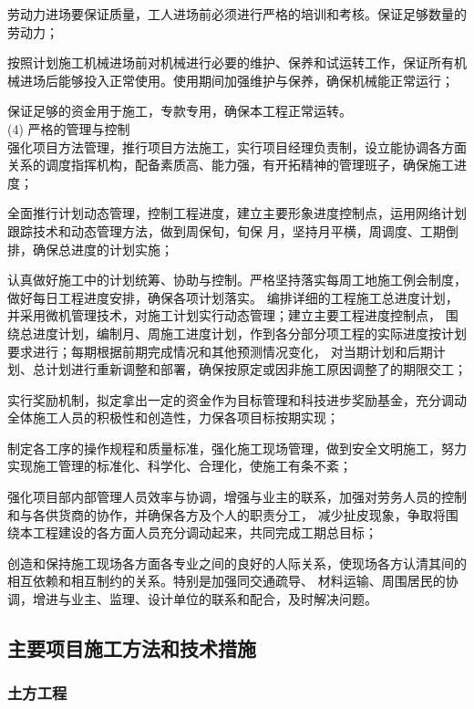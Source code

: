  劳动力进场要保证质量，工人进场前必须进行严格的培训和考核。保证足够数量的劳动力；

 按照计划施工机械进场前对机械进行必要的维护、保养和试运转工作，保证所有机械进场后能够投入正常使用。使用期间加强维护与保养，确保机械能正常运行；

 保证足够的资金用于施工，专款专用，确保本工程正常运转。\\

(4) 严格的管理与控制\\

 强化项目方法管理，推行项目方法施工，实行项目经理负责制，设立能协调各方面关系的调度指挥机构，配备素质高、能力强，有开拓精神的管理班子，确保施工进度；

 全面推行计划动态管理，控制工程进度，建立主要形象进度控制点，运用网络计划跟踪技术和动态管理方法，做到周保旬，旬保
月，坚持月平横，周调度、工期倒排，确保总进度的计划实施；

 认真做好施工中的计划统筹、协助与控制。严格坚持落实每周工地施工例会制度，做好每日工程进度安排，确保各项计划落实。
编排详细的工程施工总进度计划，并采用微机管理技术，对施工计划实行动态管理；建立主要工程进度控制点，
围绕总进度计划，编制月、周施工进度计划，作到各分部分项工程的实际进度按计划要求进行；每期根据前期完成情况和其他预测情况变化，
对当期计划和后期计划、总计划进行重新调整和部署，确保按原定或因非施工原因调整了的期限交工；

 实行奖励机制，拟定拿出一定的资金作为目标管理和科技进步奖励基金，充分调动全体施工人员的积极性和创造性，力保各项目标按期实现；

 制定各工序的操作规程和质量标准，强化施工现场管理，做到安全文明施工，努力实现施工管理的标准化、科学化、合理化，使施工有条不紊；

 强化项目部内部管理人员效率与协调，增强与业主的联系，加强对劳务人员的控制和与各供货商的协作，并确保各方及个人的职责分工，
减少扯皮现象，争取将围绕本工程建设的各方面人员充分调动起来，共同完成工期总目标；

 创造和保持施工现场各方面各专业之间的良好的人际关系，使现场各方认清其间的相互依赖和相互制约的关系。特别是加强同交通疏导、
材料运输、周围居民的协调，增进与业主、监理、设计单位的联系和配合，及时解决问题。

\subsection{主要项目施工方法和技术措施}
\subsubsection{土方工程}


